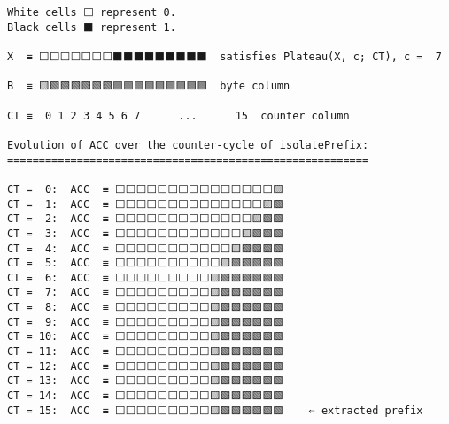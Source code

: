 \documentclass[varwidth=\maxdimen,margin=0.5cm,multi={verbatim}]{standalone}
\begin{document}
\begin{verbatim}
White cells ⬜ represent 0.
Black cells ⬛ represent 1.

X  ≡ ⬜⬜⬜⬜⬜⬜⬜⬛⬛⬛⬛⬛⬛⬛⬛⬛  satisfies Plateau(X, c; CT), c =  7
                     
B  ≡ 🟨🟩🟩🟩🟩🟩🟩🟦🟦🟦🟦🟦🟦🟦🟦🟦  byte column

CT ≡  0 1 2 3 4 5 6 7      ...      15  counter column
                                             
Evolution of ACC over the counter-cycle of isolatePrefix:
=========================================================

CT =  0:  ACC  ≡ ⬜⬜⬜⬜⬜⬜⬜⬜⬜⬜⬜⬜⬜⬜⬜🟨
CT =  1:  ACC  ≡ ⬜⬜⬜⬜⬜⬜⬜⬜⬜⬜⬜⬜⬜⬜🟨🟩
CT =  2:  ACC  ≡ ⬜⬜⬜⬜⬜⬜⬜⬜⬜⬜⬜⬜⬜🟨🟩🟩
CT =  3:  ACC  ≡ ⬜⬜⬜⬜⬜⬜⬜⬜⬜⬜⬜⬜🟨🟩🟩🟩
CT =  4:  ACC  ≡ ⬜⬜⬜⬜⬜⬜⬜⬜⬜⬜⬜🟨🟩🟩🟩🟩
CT =  5:  ACC  ≡ ⬜⬜⬜⬜⬜⬜⬜⬜⬜⬜🟨🟩🟩🟩🟩🟩
CT =  6:  ACC  ≡ ⬜⬜⬜⬜⬜⬜⬜⬜⬜🟨🟩🟩🟩🟩🟩🟩
CT =  7:  ACC  ≡ ⬜⬜⬜⬜⬜⬜⬜⬜⬜🟨🟩🟩🟩🟩🟩🟩
CT =  8:  ACC  ≡ ⬜⬜⬜⬜⬜⬜⬜⬜⬜🟨🟩🟩🟩🟩🟩🟩
CT =  9:  ACC  ≡ ⬜⬜⬜⬜⬜⬜⬜⬜⬜🟨🟩🟩🟩🟩🟩🟩
CT = 10:  ACC  ≡ ⬜⬜⬜⬜⬜⬜⬜⬜⬜🟨🟩🟩🟩🟩🟩🟩
CT = 11:  ACC  ≡ ⬜⬜⬜⬜⬜⬜⬜⬜⬜🟨🟩🟩🟩🟩🟩🟩
CT = 12:  ACC  ≡ ⬜⬜⬜⬜⬜⬜⬜⬜⬜🟨🟩🟩🟩🟩🟩🟩
CT = 13:  ACC  ≡ ⬜⬜⬜⬜⬜⬜⬜⬜⬜🟨🟩🟩🟩🟩🟩🟩
CT = 14:  ACC  ≡ ⬜⬜⬜⬜⬜⬜⬜⬜⬜🟨🟩🟩🟩🟩🟩🟩
CT = 15:  ACC  ≡ ⬜⬜⬜⬜⬜⬜⬜⬜⬜🟨🟩🟩🟩🟩🟩🟩    ⇐ extracted prefix
\end{verbatim}
\end{document}
